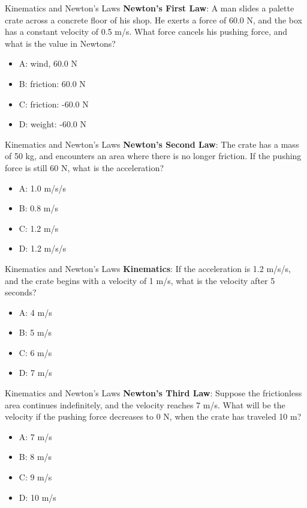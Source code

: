 \documentclass{beamer}
\begin{document}
\begin{frame}{Kinematics and Newton's Laws}
\textbf{Newton's First Law}: A man slides a palette crate across a concrete floor of his shop.  He exerts a force of 60.0 N, and the box has a constant velocity of 0.5 m/s.  What force cancels his pushing force, and what is the value in Newtons?
\begin{itemize}
\item A: wind, 60.0 N
\item B: friction: 60.0 N
\item C: friction: -60.0 N
\item D: weight: -60.0 N
\end{itemize}
\end{frame}

\begin{frame}{Kinematics and Newton's Laws}
\textbf{Newton's Second Law}: The crate has a mass of 50 kg, and encounters an area where there is no longer friction.  If the pushing force is still 60 N, what is the acceleration?
\begin{itemize}
\item A: 1.0 m/s/s
\item B: 0.8 m/s
\item C: 1.2 m/s
\item D: 1.2 m/s/s
\end{itemize}
\end{frame}

\begin{frame}{Kinematics and Newton's Laws}
\textbf{Kinematics}: If the acceleration is 1.2 m/s/s, and the crate begins with a velocity of 1 m/s, what is the velocity after 5 seconds?
\begin{itemize}
\item A: 4 m/s
\item B: 5 m/s
\item C: 6 m/s
\item D: 7 m/s
\end{itemize}
\end{frame}

\begin{frame}{Kinematics and Newton's Laws}
\textbf{Newton's Third Law}: Suppose the frictionless area continues indefinitely, and the velocity reaches 7 m/s.  What will be the velocity if the pushing force decreases to 0 N, when the crate has traveled 10 m?
\begin{itemize}
\item A: 7 m/s
\item B: 8 m/s
\item C: 9 m/s
\item D: 10 m/s
\end{itemize}
\end{frame}
\end{document}

